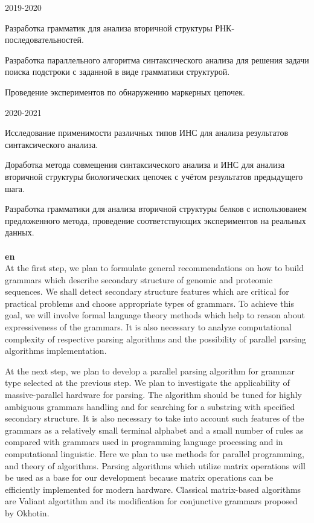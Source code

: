 \documentclass[12pt]{article}  %
\theoremstyle{remark}
\begin{document}
2019-2020

Разработка грамматик для анализа вторичной структуры РНК-последовательностей.

Разработка параллельного алгоритма синтаксического анализа для решения задачи поиска подстроки с заданной в виде грамматики структурой.

Проведение экспериментов по обнаружению маркерных цепочек.

2020-2021

Исследование применимости различных типов ИНС для анализа результатов синтаксического анализа.

Доработка метода совмещения синтаксического анализа и ИНС для анализа вторичной структуры биологических цепочек с учётом результатов предыдущего шага.

Разработка грамматики для анализа вторичной структуры белков с использоваием предложенного метода, проведение соответствующих экспериментов на реальных данных.
\\
\\
\textbf{en}\\
At the first step, we plan to formulate general recommendations on how to build grammars which describe secondary structure of genomic and proteomic sequences.
We shall detect secondary structure features which are critical for practical problems and choose appropriate types of grammars.
To achieve this goal, we will involve formal language theory methods which help to reason about expressiveness of the grammars.
It is also necessary to analyze computational complexity of respective parsing algorithms and the possibility of parallel parsing algorithms implementation.

At the next step, we plan to develop a parallel parsing algorithm for grammar type selected at the previous step.
We plan to investigate the applicability of massive-parallel hardware for parsing.
The algorithm should be tuned for highly ambiguous grammars handling and for searching for a substring with specified secondary structure.
It is also necessary to take into account such features of the grammars as a relatively small terminal alphabet and a small number of rules as compared with grammars used in programming language processing and in computational linguistic.
Here we plan to use methods for parallel programming, and theory of algorithms.
Parsing algorithms which utilize matrix operations will be used as a base for our development because matrix operations can be efficiently implemented for modern hardware.
Classical matrix-based algorithms are Valiant algortithm and its modification for conjunctive grammars proposed by Okhotin.
\end{document}
